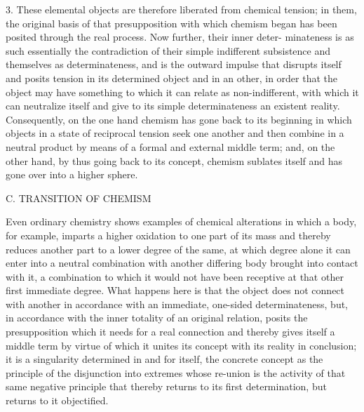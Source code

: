 3. These elemental objects are therefore liberated from chemical tension;
in them, the original basis of that presupposition with which chemism began
has been posited through the real process. Now further, their inner deter-
minateness is as such essentially the contradiction of their simple indifferent
subsistence and themselves as determinateness, and is the outward impulse
that disrupts itself and posits tension in its determined object and in an
other, in order that the object may have something to which it can relate as
non-indifferent, with which it can neutralize itself and give to its simple
determinateness an existent reality. Consequently, on the one hand
chemism has gone back to its beginning in which objects in a state of
reciprocal tension seek one another and then combine in a neutral product
by means of a formal and external middle term; and, on the other hand,
by thus going back to its concept, chemism sublates itself and has gone over
into a higher sphere.

C. TRANSITION OF CHEMISM

Even ordinary chemistry shows examples of chemical alterations in which
a body, for example, imparts a higher oxidation to one part of its mass and
thereby reduces another part to a lower degree of the same, at which degree
alone it can enter into a neutral combination with another differing body
brought into contact with it, a combination to which it would not have
been receptive at that other first immediate degree. What happens here
is that the object does not connect with another in accordance with an
immediate, one-sided determinateness, but, in accordance with the inner
totality of an original relation, posits the presupposition which it needs for a
real connection and thereby gives itself a middle term by virtue of which it
unites its concept with its reality in conclusion; it is a singularity determined
in and for itself, the concrete concept as the principle of the disjunction
into extremes whose re-union is the activity of that same negative principle
that thereby returns to its first determination, but returns to it objectified.

